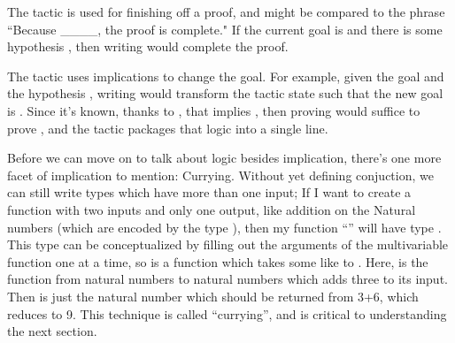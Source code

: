 The  tactic is used for finishing off a proof, and might be compared
to the phrase ``Because \_\_\_\_, the proof is complete." If the current goal is
 and there is some hypothesis , 
then writing  would complete the proof.

The  tactic uses implications to change the goal. For example, 
given the goal  and the hypothesis , writing
 would transform the tactic state such that the new goal
is . Since it's known, thanks to , that  implies , 
then proving  would suffice to prove , and the 
tactic packages that logic into a single line.

Before we can move on to talk about logic besides implication, there's 
one more facet of implication to mention: Currying. Without yet defining
conjuction, we can still write types which have more than one input; If
I want to create a function with two inputs and only one output,
like addition on the Natural numbers (which are encoded by the 
type ), then my function ``'' will have type 
. This type can be conceptualized by
filling out the arguments of the multivariable function one at a time, so
 is a function which takes some
 like  to . Here,
 is the function from natural numbers to natural numbers
which adds three to its input. Then  is just the 
natural number which should be returned from 3+6, which reduces to 9.
This technique is called ``currying'', and is critical to understanding
the next section.

